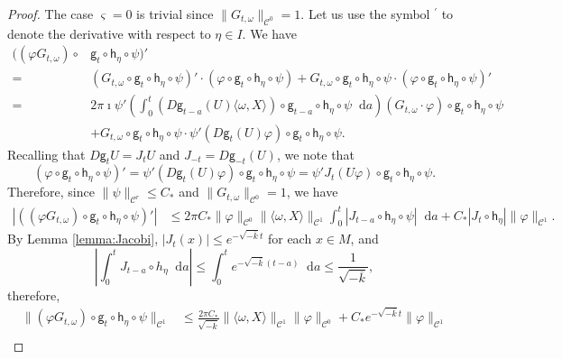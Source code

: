 \documentclass[11pt,letterpaper]{amsart}
\newcommand \cC {{\mathscr{C}}}
\newcommand{\horo}{\mathsf{h}}
\newcommand{\geo}{\mathsf{g}}
\newcommand*{\diff}{\mathop{}\!\mathrm{d}}
\theoremstyle{definition}
\begin{document}
\begin{proof}
The case $\varsigma=0$ is trivial since $ \|G_{t,\omega}\|_{\cC^0}=1$.
Let us use the symbol $^\prime$ to denote the derivative with respect to $\eta \in I$. We have
\[
\begin{split}
((\varphi G_{t,\omega})\circ & \geo_t\circ \horo_\eta\circ \psi )'\\
%
=&(G_{t,\omega}\circ \geo_t\circ \horo_\eta \circ \psi)'\cdot (\varphi\circ \geo_t\circ \horo_\eta \circ \psi)+ G_{t,\omega}\circ \geo_t\circ \horo_\eta \circ \psi\cdot (\varphi\circ \geo_t\circ \horo_\eta \circ \psi)'\\
%
=&2\pi \imath\psi'\left(  \int_0^t (D\geo_{t-a}(U) \langle \omega, X\rangle)\circ \geo_{t-a}\circ \horo_\eta\circ \psi \diff a   \right) (G_{t,\omega}\cdot\varphi)\circ \geo_t\circ \horo_\eta \circ \psi\\
%
&+G_{t,\omega}\circ \geo_t\circ \horo_\eta \circ \psi\cdot \psi' (D\geo_t(U)\varphi)\circ \geo_t\circ \horo_\eta \circ \psi.
\end{split}
\]
Recalling that $D\geo_tU=J_t U$ and $J_{-t}=D\geo_{-t}(U)$, we note that
\begin{equation}\label{eq:great}
(\varphi\circ \geo_t\circ \horo_\eta \circ \psi)'=\psi' (D\geo_t(U)\varphi)\circ \geo_t\circ \horo_\eta \circ \psi= \psi' J_t (U\varphi)\circ \geo_t\circ \horo_\eta \circ \psi.
\end{equation}
Therefore, since $\|\psi\|_{\cC^r}\le C_*$ and $\|G_{t,\omega}\|_{\cC^0}=1$, we have
\[
\begin{split}
|((\varphi G_{t,\omega})\circ \geo_t\circ \horo_\eta\circ \psi )'| 
&\le 2\pi C_*\|\varphi\|_{\cC^0}\|\langle \omega, X \rangle \|_{\cC^1}\int_0^t |J_{t-a} \circ \horo_\eta \circ \psi |\diff  a+C_*|J_t\circ \horo_\eta|\|\varphi\|_{\cC^1}.
\end{split}
\]
By Lemma \ref{lemma:Jacobi}, $|J_t(x)|\le e^{-\sqrt{-\overline k}t}$ for each $x\in M$, and
\begin{equation}\label{eq:intJ}
\left|\int_0^t J_{t-a}\circ h_\eta \diff a\right|\le \int_0^t e^{-\sqrt{-\overline k}(t-a)}\diff a \le \dfrac{1}{\sqrt{-\overline k}},
\end{equation}
therefore,
\begin{equation}\label{eq:C1G}
\begin{split}
\|(\varphi G_{t,\omega})\circ \geo_t\circ \horo_\eta\circ \psi \|_{\cC^1} 
&\le \frac{2\pi C_*}{\sqrt{-\overline k}}\|\langle \omega, X \rangle \|_{\cC^1} \|\varphi\|_{\cC^0}+C_*e^{-\sqrt{-\overline k}t}\|\varphi\|_{\cC^1}\\

\end{split}
\end{equation}
\end{proof}
\end{document}
